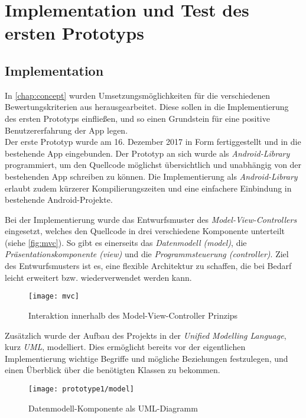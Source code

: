 \section{Implementation und Test des ersten Prototyps}\label{sec:pro1}

\subsection{Implementation}
In \autoref{chap:concept} wurden Umsetzungsmöglichkeiten für die verschiedenen Bewertungskriterien aus  herausgearbeitet.
Diese sollen in die Implementierung des ersten Prototyps einfließen, und so einen Grundstein für eine positive Benutzererfahrung der App legen. \\

Der erste Prototyp wurde am 16. Dezember 2017 in Form fertiggestellt und in die bestehende App eingebunden.
Der Prototyp an sich wurde als \emph{Android-Library} programmiert, um den Quellcode möglichst übersichtlich und unabhängig von der bestehenden App schreiben zu können.
Die Implementierung als \emph{Android-Library} erlaubt zudem kürzerer Kompilierungszeiten und eine einfachere Einbindung in bestehende Android-Projekte. \\

Bei der Implementierung wurde das Entwurfsmuster des \emph{Model-View-Controllers} eingesetzt, welches den Quellcode in drei verschiedene Komponente unterteilt (siehe \autoref{fig:mvc}).
So gibt es einerseits das \emph{Datenmodell (model)}, die \emph{Präsentationskomponente (view)} und die \emph{Programmsteuerung (controller)}.
Ziel des Entwurfsmusters ist es, eine flexible Architektur zu schaffen, die bei Bedarf leicht erweitert bzw. wiederverwendet werden kann.

\begin{figure}[h]
  \centering
  \texttt{[image: mvc]}
  \caption{Interaktion innerhalb des Model-View-Controller Prinzips}
  \label{fig:mvc}
\end{figure}

\noindent
Zusätzlich wurde der Aufbau des Projekts in der \emph{Unified Modelling Language}, kurz \emph{UML}, modelliert.
Dies ermöglicht bereits vor der eigentlichen Implementierung wichtige Begriffe und mögliche Beziehungen festzulegen, und einen Überblick über die benötigten Klassen zu bekommen.

\begin{figure}[h]
  \centering
  \texttt{[image: prototype1/model]}
  \caption{Datenmodell-Komponente als UML-Diagramm}
  \label{fig:model1}
\end{figure}

